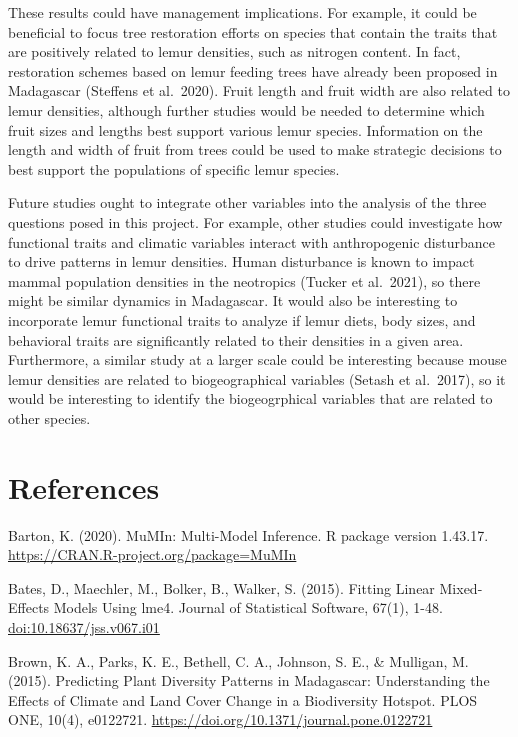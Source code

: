 \documentclass[
  12pt,
]{article}
\begin{document}
These results could have management implications. For example, it could
be beneficial to focus tree restoration efforts on species that contain
the traits that are positively related to lemur densities, such as
nitrogen content. In fact, restoration schemes based on lemur feeding
trees have already been proposed in Madagascar (Steffens et al.~2020).
Fruit length and fruit width are also related to lemur densities,
although further studies would be needed to determine which fruit sizes
and lengths best support various lemur species. Information on the
length and width of fruit from trees could be used to make strategic
decisions to best support the populations of specific lemur species.

Future studies ought to integrate other variables into the analysis of
the three questions posed in this project. For example, other studies
could investigate how functional traits and climatic variables interact
with anthropogenic disturbance to drive patterns in lemur densities.
Human disturbance is known to impact mammal population densities in the
neotropics (Tucker et al.~2021), so there might be similar dynamics in
Madagascar. It would also be interesting to incorporate lemur functional
traits to analyze if lemur diets, body sizes, and behavioral traits are
significantly related to their densities in a given area. Furthermore, a
similar study at a larger scale could be interesting because mouse lemur
densities are related to biogeographical variables (Setash et al.~2017),
so it would be interesting to identify the biogeogrphical variables that
are related to other species.

\newpage

\hypertarget{references}{%
\section{References}\label{references}}

Barton, K. (2020). MuMIn: Multi-Model Inference. R package version
1.43.17. \url{https://CRAN.R-project.org/package=MuMIn}

Bates, D., Maechler, M., Bolker, B., Walker, S. (2015). Fitting Linear
Mixed-Effects Models Using lme4. Journal of Statistical Software, 67(1),
1-48. \url{doi:10.18637/jss.v067.i01}

Brown, K. A., Parks, K. E., Bethell, C. A., Johnson, S. E., \& Mulligan,
M. (2015). Predicting Plant Diversity Patterns in Madagascar:
Understanding the Effects of Climate and Land Cover Change in a
Biodiversity Hotspot. PLOS ONE, 10(4), e0122721.
\url{https://doi.org/10.1371/journal.pone.0122721}
\end{document}
